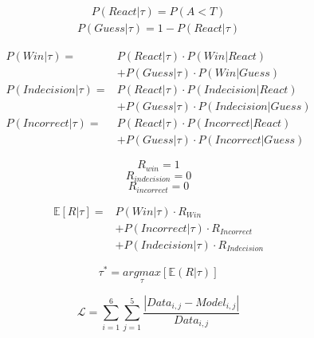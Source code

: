\documentclass[12pt,letterpaper]{article}
\begin{document}
\begin{align}
    P(React|\tau) = P(A<T)
\end{align}
\begin{align}
    P(Guess|\tau) = 1 - P(React|\tau)
\end{align}


\begin{align}
    P(Win|\tau)        = & P(React|\tau) \cdot P(Win|React) \nonumber        \\ &+  P(Guess|\tau) \cdot P(Win|Guess)\\
    P(Indecision|\tau) = & P(React|\tau) \cdot P(Indecision|React) \nonumber \\ &+ P(Guess|\tau) \cdot P(Indecision|Guess) \\
    P(Incorrect|\tau)  = & P(React|\tau) \cdot P(Incorrect|React) \nonumber  \\ &+ P(Guess|\tau) \cdot P(Incorrect|Guess)
\end{align}


\begin{equation}
    R_{win} = 1
\end{equation}
\begin{equation}
    R_{indecision} = 0
\end{equation}
\begin{equation}
    R_{incorrect} = 0
\end{equation}

\begin{align}
    \mathbb{E}[R|\tau] = & P(Win|\tau) \cdot R_{Win} \nonumber \\ &+ P(Incorrect|\tau) \cdot R_{Incorrect} \nonumber \\ &+ P(Indecision|\tau) \cdot R_{Indecision}
\end{align}

\begin{equation}
    \tau^* = \underset{\tau}{argmax}[\mathbb{E}(R|\tau)]
\end{equation}

\begin{equation}
    \mathcal{L} = \sum_{i = 1}^{6} \sum_{j = 1}^{5} \frac{|Data_{i,j} - Model_{i,j}|}{Data_{i,j}}
\end{equation}
\end{document}
